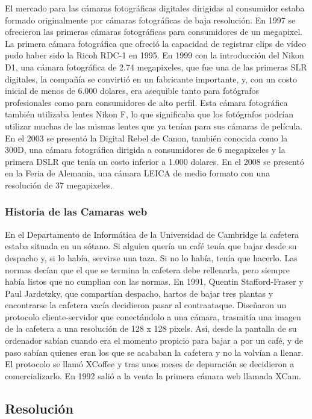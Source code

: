 \documentclass[12pt,a4papert,woside,openright,titlepage,final]{book}
\begin{document}
El mercado para las cámaras fotográficas digitales dirigidas al consumidor
estaba formado originalmente por cámaras fotográficas de baja resolución. En
1997 se ofrecieron las primeras cámaras fotográficas para consumidores de un
megapixel. La primera cámara fotográfica que ofreció la capacidad de registrar
clips de vídeo pudo haber sido la Ricoh RDC-1 en 1995.
En 1999 con la introducción del Nikon D1, una cámara fotográfica de 2.74
megapixeles, que fue una de las primeras SLR digitales, la compañía se convirtió
en un fabricante importante, y, con un costo inicial de menos de 6.000 dolares,
era asequible tanto para fotógrafos profesionales como para consumidores de alto
perfil. Esta cámara fotográfica también utilizaba lentes Nikon F, lo que
significaba que los fotógrafos podrían utilizar muchas de las mismas lentes que
ya tenían para sus cámaras de película.
En el 2003 se presentó la Digital Rebel de Canon, también conocida como la 300D,
una cámara fotográfica dirigida a consumidores de 6 megapixeles y la primera
DSLR que tenía un costo inferior a 1.000 dolares.
En el 2008 se presentó en la Feria de Alemania, una cámara LEICA de medio
formato con una resolución de 37 megapixeles.

\subsubsection{Historia de las Camaras web}

En el Departamento de Informática de la Universidad de Cambridge la cafetera
estaba situada en un sótano. Si alguien quería un café tenía que bajar desde su
despacho y, si lo había, servirse una taza. Si no lo había, tenía que hacerlo.
Las normas decían que el que se termina la cafetera debe rellenarla, pero
siempre había listos que no cumplian con las normas.
En 1991, Quentin Stafford-Fraser y Paul Jardetzky, que compartían despacho,
hartos de bajar tres plantas y encontrarse la cafetera vacía decidieron pasar al
contraataque. Diseñaron un protocolo cliente-servidor que conectándolo a una
cámara, trasmitía una imagen de la cafetera a una resolución de 128 x 128
pixels.
Así, desde la pantalla de su ordenador sabían cuando era el momento propicio
para bajar a por un café, y de paso sabían quienes eran los que se acababan la
cafetera y no la volvían a llenar. El protocolo se llamó XCoffee y tras unos
meses de depuración se decidieron a comercializarlo. En 1992 salió a la venta la
primera cámara web llamada XCam.

\subsection{Resolución}
\end{document}
